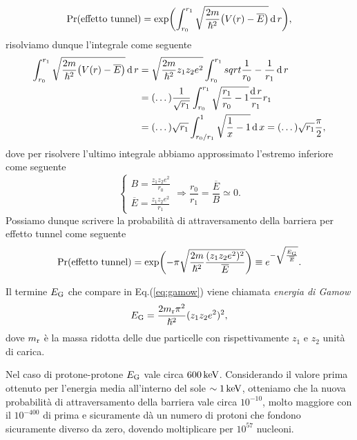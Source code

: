 \begin{equation*}
    \Pr(\textup{effetto tunnel}) = \exp \biggl( \displaystyle\int_{r_0}^{r_1} \sqrt{\frac{2m}{\hslash ^2}\bigl( V(r) - \overline{E} \bigr)} \operatorname{d} r \biggr),
\end{equation*}
risolviamo dunque l'integrale come seguente
\begin{equation*}
    \begin{split}
        \displaystyle\int_{r_0}^{r_1} \sqrt{\frac{2m}{\hslash ^2}\bigl( V(r) - \overline{E} \bigr)} \operatorname{d} r & = \sqrt{\frac{2m}{\hslash ^2}z_1 z_2 e^2} \int_{r_0}^{r_1} sqrt{\frac{1}{r_0} - \frac{1}{r_1}} \operatorname{d} r \\
        & = (\dots) \frac{1}{\sqrt{r_1}} \int_{r_0}^{r_1} \sqrt{\frac{r_1}{r_0} - 1} \frac{\operatorname{d} r}{r_1} r_1 \\
        & = (\dots) \sqrt{r_1} \int_{r_0 / r_1}^{1} \sqrt{\frac{1}{x} - 1} \operatorname{d} x = (\dots) \sqrt{r_1} \frac{\pi}{2},
    \end{split}
\end{equation*}
dove per risolvere l'ultimo integrale abbiamo approssimato l'estremo inferiore come seguente
\begin{equation*}
    \begin{cases}
        B = \frac{z_1 z_2 e^2}{r_0} \\
        \overline{E} = \frac{z_1 z_2 e^2}{r_1} 
    \end{cases}
    \Rightarrow \frac{r_0}{r_1} = \frac{\overline{E}}{B} \simeq 0.
\end{equation*}
Possiamo dunque scrivere la probabilità di attraversamento della barriera per effetto tunnel come seguente
\begin{equation}
    \Pr (\textup{effetto tunnel}) = \exp \biggl( -\pi \sqrt{\frac{2m}{\hslash^2} \frac{(z_1 z_2 e^2)^2}{\overline{E}}}\biggr) \equiv e^{-\sqrt{\frac{E_\textup{G}}{\overline{E}}}}.\label{eq:gamow} 
\end{equation}
\begin{definition}
    Il termine $E_\textup{G}$ che compare in Eq.(\ref{eq:gamow}) viene chiamata \emph{energia di Gamow}
    \begin{equation*}
        E_\textup{G} = \frac{2m_\textup{r}\pi^2}{\hslash^2}(z_1 z_2 e^2)^2,
    \end{equation*}
    dove $m_\textup{r}$ è la massa ridotta delle due particelle con rispettivamente $z_1$ e $z_2$ unità di carica.
\end{definition}
Nel caso di protone-protone $E_\textup{G}$ vale circa $600\,\textup{keV}$. Considerando il valore prima ottenuto per l'energia media all'interno del sole $\sim 1 \,\textup{keV}$, otteniamo che la nuova probabilità di attraversamento della barriera vale circa $10^{-10}$, molto maggiore con il $10^{-400}$ di prima e sicuramente dà un numero di protoni che fondono sicuramente diverso da zero, dovendo moltiplicare per $10^{57}$ nucleoni.

